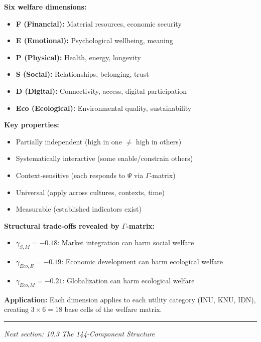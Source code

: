 \begin{tcolorbox}[colback=gray!5!white, colframe=gray!75!black, title=Section 10.2 Summary]
\textbf{Six welfare dimensions:}
\begin{itemize}
\item \textbf{F (Financial):} Material resources, economic security
\item \textbf{E (Emotional):} Psychological wellbeing, meaning
\item \textbf{P (Physical):} Health, energy, longevity
\item \textbf{S (Social):} Relationships, belonging, trust
\item \textbf{D (Digital):} Connectivity, access, digital participation
\item \textbf{Eco (Ecological):} Environmental quality, sustainability
\end{itemize}

\textbf{Key properties:}
\begin{itemize}
\item Partially independent (high in one $\neq$ high in others)
\item Systematically interactive (some enable/constrain others)
\item Context-sensitive (each responds to $\Psi$ via $\Gamma$-matrix)
\item Universal (apply across cultures, contexts, time)
\item Measurable (established indicators exist)
\end{itemize}

\textbf{Structural trade-offs revealed by $\Gamma$-matrix:}
\begin{itemize}
\item $\gamma_{S,M} = -0.18$: Market integration can harm social welfare
\item $\gamma_{Eco,E} = -0.19$: Economic development can harm ecological welfare
\item $\gamma_{Eco,M} = -0.21$: Globalization can harm ecological welfare
\end{itemize}

\textbf{Application:}
Each dimension applies to each utility category (INU, KNU, IDN),
creating $3 \times 6 = 18$ base cells of the welfare matrix.
\end{tcolorbox}

\vspace{1em}
\hrule
\vspace{0.5em}
\noindent\textit{Next section: 10.3 The 144-Component Structure}

